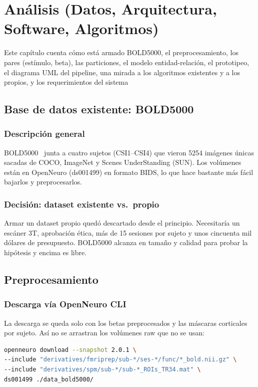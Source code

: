\chapter{Análisis (Datos, Arquitectura, Software, Algoritmos)}

Este capítulo cuenta cómo está armado BOLD5000, el preprocesamiento, los
pares (estímulo, beta), las particiones, el modelo entidad-relación, el prototipeo,
el diagrama UML del pipeline, una mirada a los algoritmos existentes y a los
propios, y los requerimientos del sistema

\section{Base de datos existente: BOLD5000}

\subsection{Descripción general}

BOLD5000~\cite{chang2019bold5000} junta a cuatro sujetos (CSI1–CSI4) que vieron 5254 imágenes
únicas sacadas de COCO, ImageNet y Scenes UnderStanding (SUN). Los
volúmenes están en OpenNeuro (ds001499) en formato BIDS, lo que hace
bastante más fácil bajarlos y preprocesarlos.

\subsection{Decisión: dataset existente vs.\ propio}

Armar un dataset propio quedó descartado desde el principio. Necesitaría
un escáner 3T, aprobación ética, más de 15 sesiones por sujeto y unos cincuenta
mil dólares de presupuesto. BOLD5000 alcanza en tamaño y calidad para
probar la hipótesis y encima es libre.

\section{Preprocesamiento}

\subsection{Descarga vía OpenNeuro CLI}

La descarga se queda solo con los betas preprocesados y las máscaras
corticales por sujeto. Así no se arrastran los volúmenes raw que no se usan:

\begin{lstlisting}[language=bash, caption=Descarga selectiva BOLD5000, label={lst:openneuro}]
openneuro download --snapshot 2.0.1 \
--include "derivatives/fmriprep/sub-*/ses-*/func/*_bold.nii.gz" \
--include "derivatives/spm/sub-*/sub-*_ROIs_TR34.mat" \
ds001499 ./data_bold5000/
\end{lstlisting}

